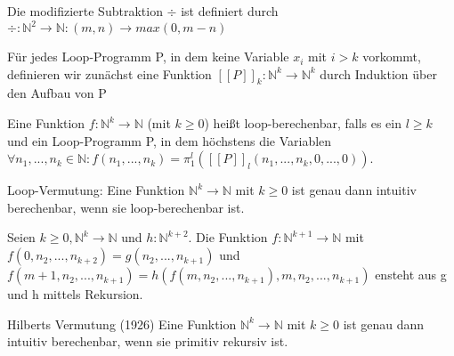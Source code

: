 \documentclass[avery5371]{flashcards}
\begin{document}
\begin{flashcard}[Definition]{} Die modifizierte Subtraktion $\div$ ist definiert durch $\div: \mathbb{N}^2 \rightarrow \mathbb{N}: (m,n)\rightarrow max(0,m-n)$
\end{flashcard}

\begin{flashcard}[Definition]{} Für jedes Loop-Programm P, in dem keine Variable $x_i$ mit $i>k$ vorkommt, definieren wir zunächst eine Funktion $[[P]]_k:\mathbb{N}^k\rightarrow \mathbb{N}^k$ durch Induktion über den Aufbau von P 
\end{flashcard}

\begin{flashcard}[Definition]{} Eine Funktion $f:\mathbb{N}^k\rightarrow\mathbb{N}$ (mit $k\geq 0$) heißt loop-berechenbar, falls es ein $l\geq k$ und ein Loop-Programm P, in dem höchstens die Variablen $\forall n_1,...,n_k\in\mathbb{N}:f(n_1,...,n_k)=\pi_1^l([[P]]_l(n_1,...,n_k,0,...,0))$.

Loop-Vermutung: Eine Funktion $\mathbb{N}^k\rightarrow \mathbb{N}$ mit $k \geq 0$ ist genau dann intuitiv berechenbar, wenn sie loop-berechenbar ist.
\end{flashcard}

\begin{flashcard}[Definition]{} Seien $k\geq 0, \mathbb{N}^k\rightarrow \mathbb{N}$ und $h:\mathbb{N}^{k+2}$. Die Funktion $f:\mathbb{N}^{k+1}\rightarrow\mathbb{N}$ mit $f(0,n_2,...,n_{k+2})=g(n_2,...,n_{k+1})$ und $f(m+1, n_2,...,n_{k+1})=h(f(m,n_2,...,n_{k+1}),m,n_2,...,n_{k+1})$ ensteht aus g und h mittels Rekursion.
\end{flashcard}

\begin{flashcard}[Definition]{Hilberts Vermutung (1926)} Eine Funktion $\mathbb{N}^k\rightarrow\mathbb{N}$ mit $k\geq 0$ ist genau dann intuitiv berechenbar, wenn sie primitiv rekursiv ist. 
\end{flashcard}
\end{document}
